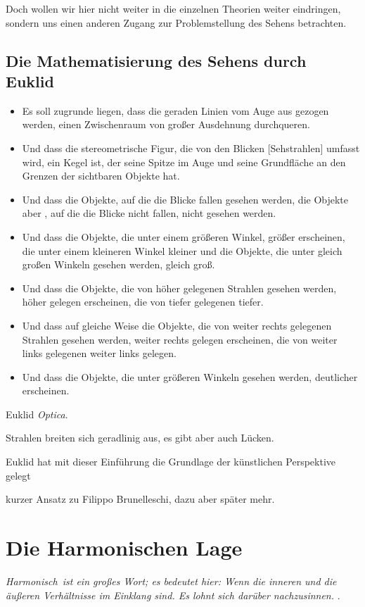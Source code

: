 \documentclass[12pt,a4paper]{article}
\begin{document}
Doch wollen wir hier nicht weiter in die einzelnen Theorien weiter eindringen, sondern uns einen anderen Zugang zur Problemstellung des Sehens betrachten.

\subsection{Die Mathematisierung des Sehens durch Euklid} 

\begin{itemize}
\item Es soll zugrunde liegen, dass die geraden Linien vom Auge aus gezogen werden, einen Zwischenraum von großer Ausdehnung durchqueren.
\item Und dass die stereometrische Figur, die von den Blicken [Sehstrahlen] umfasst wird, ein Kegel ist, der seine Spitze im Auge und seine Grundfläche an den Grenzen der sichtbaren Objekte hat.
\item Und dass die Objekte, auf die die Blicke fallen gesehen werden, die Objekte aber , auf die die Blicke nicht fallen, nicht gesehen werden.
\item Und dass die Objekte, die unter einem größeren Winkel, größer erscheinen, die unter einem kleineren Winkel kleiner und die Objekte, die unter gleich großen Winkeln gesehen werden, gleich groß.
\item Und dass die Objekte, die von höher gelegenen Strahlen gesehen werden, höher gelegen erscheinen, die von tiefer gelegenen tiefer.
\item Und dass auf gleiche Weise die Objekte, die von weiter rechts gelegenen Strahlen gesehen werden, weiter rechts gelegen erscheinen, die von weiter links gelegenen weiter links gelegen.
\item Und dass die Objekte, die unter größeren Winkeln gesehen werden, deutlicher erscheinen.
\end{itemize}
Euklid \textit{Optica}.

Strahlen breiten sich geradlinig aus, es gibt aber auch Lücken.

Euklid hat mit dieser Einführung die Grundlage der künstlichen Perspektive gelegt

kurzer Ansatz zu Filippo Brunelleschi, dazu aber später mehr.

\newpage
\section{Die Harmonischen Lage}
\textit{\glqq Harmonisch\grqq ~ist ein großes Wort; es bedeutet hier: Wenn die inneren und die äußeren Verhältnisse im Einklang sind. Es lohnt sich darüber nachzusinnen.} \citep[S.~53]{projektiveGeometrie}.
\end{document}
